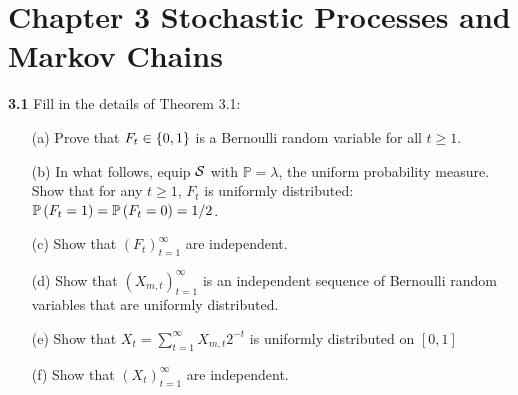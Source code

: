 
\chapter*{Chapter 3 Stochastic Processes and Markov Chains}
\label{sec:second}

\noindent\textbf{3.1} Fill in the details of Theorem 3.1:


\begin{enumerate}
   \item[(a)] Prove that $F_t \in \left\{ 0,1 \right\}$ is a Bernoulli random variable for all $t \ge 1$.
   \item[(b)] In what follows, equip $\mathcal{S}$ with $\mathbb{P}=\lambda$, the uniform probability measure. Show that for any $t \ge 1$, $F_t$ is uniformly distributed: $\mathbb{P} \left(F_t= 1 \right) = \mathbb{P} \left(F_t = 0\right) = 1/2$. 
   \item[(c)] Show that $(F_t)_{t=1}^{\infty}$ are independent.
   \item[(d)] Show that $(X_{m,t})_{t=1}^\infty$ is an independent sequence of Bernoulli random variables that are uniformly distributed.
   \item[(e)] Show that $X_t = \sum_{t=1}^\infty X_{m,t}2^{-t}$ is uniformly distributed on $[0,1]$
   \item[(f)] Show that $(X_t)_{t=1}^\infty$ are independent.
\end{enumerate}

